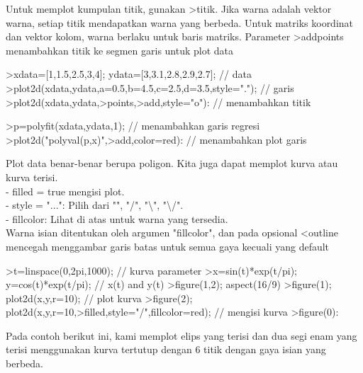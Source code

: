 \documentclass[a4paper,10pt]{article}
\begin{document}
\begin{eulernotebook}
\begin{eulercomment}
\begin{eulercomment}
\begin{eulercomment}
Untuk memplot kumpulan titik, gunakan \textgreater{}titik. Jika warna adalah vektor
warna, setiap titik mendapatkan warna yang berbeda. Untuk matriks
koordinat dan vektor kolom, warna berlaku untuk baris matriks.
Parameter \textgreater{}addpoints menambahkan titik ke segmen garis untuk plot data
\end{eulercomment}
\begin{eulerprompt}
>xdata=[1,1.5,2.5,3,4]; ydata=[3,3.1,2.8,2.9,2.7]; // data
>plot2d(xdata,ydata,a=0.5,b=4.5,c=2.5,d=3.5,style="."); // garis
>plot2d(xdata,ydata,>points,>add,style="o"): // menambahkan titik
\end{eulerprompt}
\begin{eulerprompt}
>p=polyfit(xdata,ydata,1); // menambahkan garis regresi
>plot2d("polyval(p,x)",>add,color=red): // menambahkan plot garis
\end{eulerprompt}
\begin{eulercomment}
Plot data benar-benar berupa poligon. Kita juga dapat memplot kurva
atau kurva terisi. \\
- filled = true mengisi plot. \\
- style = "...": Pilih dari "", "/", "\textbackslash{}", "\textbackslash{}/". \\
- fillcolor: Lihat di atas untuk warna yang tersedia. \\
Warna isian ditentukan oleh argumen "fillcolor", dan pada opsional
\textless{}outline mencegah menggambar garis batas untuk semua gaya kecuali yang
default
\end{eulercomment}
\begin{eulerprompt}
>t=linspace(0,2pi,1000); // kurva parameter
>x=sin(t)*exp(t/pi); y=cos(t)*exp(t/pi); // x(t) and y(t)
>figure(1,2); aspect(16/9)
>figure(1); plot2d(x,y,r=10); // plot kurva
>figure(2); plot2d(x,y,r=10,>filled,style="/",fillcolor=red); // mengisi kurva
>figure(0):
\end{eulerprompt}
\begin{eulercomment}
Pada contoh berikut ini, kami memplot elips yang terisi dan dua segi
enam yang terisi menggunakan kurva tertutup dengan 6 titik dengan gaya
isian yang berbeda.
\end{eulercomment}
\begin{eulerprompt}

\end{eulerprompt}
\end{eulercomment}
\end{eulercomment}
\end{eulernotebook}
\end{document}
